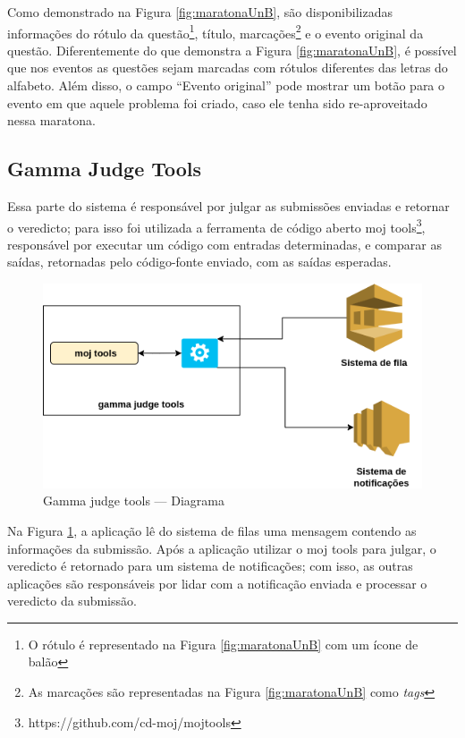 Como demonstrado na Figura \ref{fig:maratonaUnB}, são disponibilizadas informações do rótulo da questão\footnote{O rótulo é representado na Figura \ref{fig:maratonaUnB} com um ícone de balão}, título, marcações\footnote{As marcações são representadas na Figura \ref{fig:maratonaUnB} como \textit{tags}} e o evento original da questão. Diferentemente do que demonstra a Figura \ref{fig:maratonaUnB}, é possível que nos eventos as questões sejam marcadas com rótulos diferentes das letras do alfabeto. Além disso, o campo ``Evento original'' pode mostrar um botão para o evento em que aquele problema foi criado, caso ele tenha sido re-aproveitado nessa maratona.

\subsection{Gamma Judge Tools}
\label{sec:gamaJudgeTools}

Essa parte do sistema é responsável por julgar as submissões enviadas e retornar o veredicto; para isso foi utilizada a ferramenta de código aberto moj tools\footnote{https://github.com/cd-moj/mojtools}, responsável por executar um código com entradas determinadas, e comparar as saídas, retornadas pelo código-fonte enviado, com as saídas esperadas.

\begin{figure}[H]
    \centering
    \includegraphics[keepaspectratio=true,scale=0.5]{figuras/gamma_judge_tools_diagram.png}
    \caption{Gamma judge tools — Diagrama}
    \label{fig:judge_tools_diagram}
\end{figure}

Na Figura \ref{fig:judge_tools_diagram}, a aplicação lê do sistema de filas uma mensagem contendo as informações da submissão. Após a aplicação utilizar o moj tools para julgar, o veredicto é retornado para um sistema de notificações; com isso, as outras aplicações são responsáveis por lidar com a notificação enviada e processar o veredicto da submissão. 


